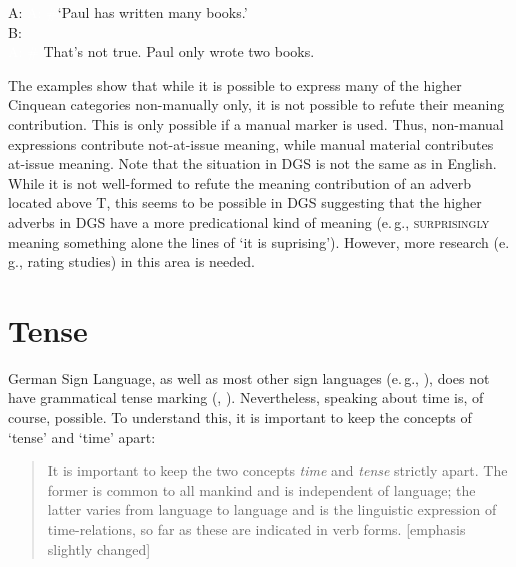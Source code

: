 \begin{exe}
\ex A:  
\glt \textcolor{white}{A: \#}`Paul has written many books.' \\
B:  \\
\textcolor{white}{A: \#} That's not true. Paul only wrote two books.

\label{bsp:evaluationmuchlittlebnotatissueb}

\end{exe}

\noindent The examples show that while it is possible to express many of the higher Cinquean categories non-manually only, it is not possible to refute their meaning contribution. This is only possible if a manual marker is used. Thus, non-manual expressions contribute not-at-issue meaning, while manual material contributes at-issue meaning. Note that the situation in DGS is not the same as in English. While it is not well-formed to refute the meaning contribution of an adverb located above T, this seems to be possible in DGS suggesting that the higher adverbs in DGS have a more predicational kind of meaning (e.\,g., \textsc{surprisingly} meaning something alone the lines of `it is suprising'). However, more research (e.\,g., rating studies) in this area is needed.

\section{Tense}\label{tense}
German Sign Language, as well as most other sign languages (e.\,g., \citealt{cogen1977three, sandler2006sign}), does not have grammatical tense marking (\citealt{metzger2009zeitlinien}, \citealt[118]{happ2014vork}). Nevertheless, speaking about time is, of course, possible. To understand this, it is important to keep the concepts of `tense' and `time' apart:

\begin{quote}
It is important to keep the two concepts \textit{time} and \textit{tense} strictly apart. The former is common to all mankind and is independent of language; the latter varies from language to language and is the linguistic expression of time-relations, so far as these are indicated in verb forms. \citep[230]{jespersen1933essentials} [emphasis slightly changed]
\end{quote}


